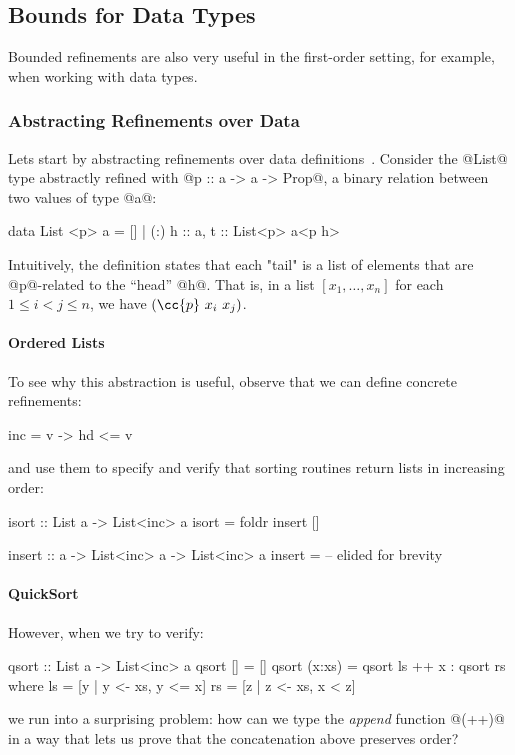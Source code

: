 \subsection{Bounds for Data Types} \label{sec:overview:data}

Bounded refinements are also very useful in the first-order 
setting, for example, when working with data types.

\subsubsection*{Abstracting Refinements over Data}

Lets start by abstracting refinements over data
definitions~\cite{vazou13}. Consider the @List@ type
abstractly refined with @p :: a -> a -> Prop@, a binary relation
between two values of type @a@:
%
\begin{code}
    data List <p> a 
      = [] | (:) {h :: a, t :: List<p> a<p h>}
\end{code}
%
Intuitively, the definition states that each "tail" is a list of
elements that are @p@-related to the ``head'' @h@. That is, 
in a list $[x_1,\ldots,x_n]$ for each $1 \leq i < j \leq n$, we 
have $(\cc{p}\ x_i\ x_j)$.

\paragraph{Ordered Lists} To see why this abstraction is useful,
observe that we can define concrete refinements:
%
\begin{code}
    inc = \hd v -> hd <= v
\end{code}
%
and use them to specify and verify that sorting routines return 
lists in increasing order:
%
\begin{code}
   isort :: List a -> List<inc> a
   isort = foldr insert []

   insert :: a -> List<inc> a -> List<inc> a
   insert =  -- elided for brevity 
\end{code}

\paragraph{QuickSort} However, when we try to verify:
%
\begin{code}
    qsort        :: List a -> List<inc> a
    qsort []     = []
    qsort (x:xs) = qsort ls ++ x : qsort rs
      where
        ls       = [y | y <- xs, y <= x]  
        rs       = [z | z <- xs, x <  z]  
\end{code}
%
we run into a surprising problem: how can we type the \emph{append} 
function @(++)@ in a way that lets us prove that the concatenation 
above preserves order? 

